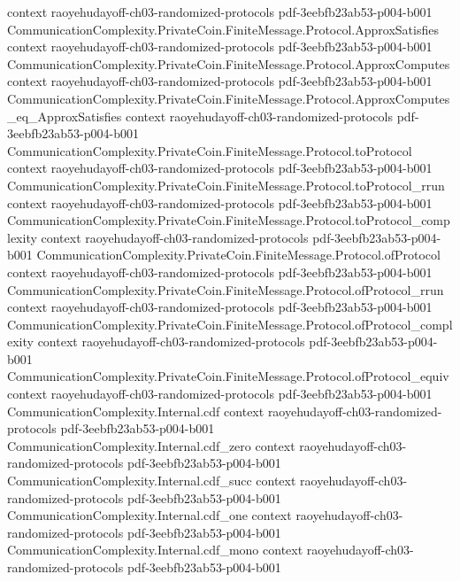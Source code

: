 \begin{theorem}
  {context}
  {raoyehudayoff-ch03-randomized-protocols}
  {pdf-3eebfb23ab53-p004-b001}
\proofstep
  {CommunicationComplexity.PrivateCoin.FiniteMessage.Protocol.ApproxSatisfies}
  {context}
  {raoyehudayoff-ch03-randomized-protocols}
  {pdf-3eebfb23ab53-p004-b001}
\proofstep
  {CommunicationComplexity.PrivateCoin.FiniteMessage.Protocol.ApproxComputes}
  {context}
  {raoyehudayoff-ch03-randomized-protocols}
  {pdf-3eebfb23ab53-p004-b001}
\proofstep
  {CommunicationComplexity.PrivateCoin.FiniteMessage.Protocol.ApproxComputes_eq_ApproxSatisfies}
  {context}
  {raoyehudayoff-ch03-randomized-protocols}
  {pdf-3eebfb23ab53-p004-b001}
\proofstep
  {CommunicationComplexity.PrivateCoin.FiniteMessage.Protocol.toProtocol}
  {context}
  {raoyehudayoff-ch03-randomized-protocols}
  {pdf-3eebfb23ab53-p004-b001}
\proofstep
  {CommunicationComplexity.PrivateCoin.FiniteMessage.Protocol.toProtocol_rrun}
  {context}
  {raoyehudayoff-ch03-randomized-protocols}
  {pdf-3eebfb23ab53-p004-b001}
\proofstep
  {CommunicationComplexity.PrivateCoin.FiniteMessage.Protocol.toProtocol_complexity}
  {context}
  {raoyehudayoff-ch03-randomized-protocols}
  {pdf-3eebfb23ab53-p004-b001}
\proofstep
  {CommunicationComplexity.PrivateCoin.FiniteMessage.Protocol.ofProtocol}
  {context}
  {raoyehudayoff-ch03-randomized-protocols}
  {pdf-3eebfb23ab53-p004-b001}
\proofstep
  {CommunicationComplexity.PrivateCoin.FiniteMessage.Protocol.ofProtocol_rrun}
  {context}
  {raoyehudayoff-ch03-randomized-protocols}
  {pdf-3eebfb23ab53-p004-b001}
\proofstep
  {CommunicationComplexity.PrivateCoin.FiniteMessage.Protocol.ofProtocol_complexity}
  {context}
  {raoyehudayoff-ch03-randomized-protocols}
  {pdf-3eebfb23ab53-p004-b001}
\proofstep
  {CommunicationComplexity.PrivateCoin.FiniteMessage.Protocol.ofProtocol_equiv}
  {context}
  {raoyehudayoff-ch03-randomized-protocols}
  {pdf-3eebfb23ab53-p004-b001}
\proofstep
  {CommunicationComplexity.Internal.cdf}
  {context}
  {raoyehudayoff-ch03-randomized-protocols}
  {pdf-3eebfb23ab53-p004-b001}
\proofstep
  {CommunicationComplexity.Internal.cdf_zero}
  {context}
  {raoyehudayoff-ch03-randomized-protocols}
  {pdf-3eebfb23ab53-p004-b001}
\proofstep
  {CommunicationComplexity.Internal.cdf_succ}
  {context}
  {raoyehudayoff-ch03-randomized-protocols}
  {pdf-3eebfb23ab53-p004-b001}
\proofstep
  {CommunicationComplexity.Internal.cdf_one}
  {context}
  {raoyehudayoff-ch03-randomized-protocols}
  {pdf-3eebfb23ab53-p004-b001}
\proofstep
  {CommunicationComplexity.Internal.cdf_mono}
  {context}
  {raoyehudayoff-ch03-randomized-protocols}
  {pdf-3eebfb23ab53-p004-b001}
\proofstep

\end{theorem}
